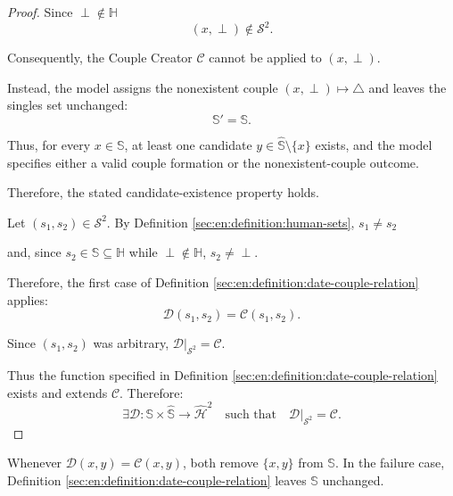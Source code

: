 \begin{theorem}
\begin{proof}
        Since $\perp\notin\mathbb H$
        $$(x,\perp)\notin\mathcal S^2. $$

        Consequently, the Couple Creator $\mathcal C$ cannot be applied to $(x,\perp)$.

        Instead, the model assigns the nonexistent couple $(x,\perp)\longmapsto\triangle$ and leaves the singles set unchanged:
        $$\mathbb S'=\mathbb S.$$

        Thus, for every $x\in\mathbb S$, at least one candidate $y\in\hat{\mathbb S}\setminus\{x\}$ exists, and the model specifies either a valid couple formation or the nonexistent-couple outcome.

        Therefore, the stated candidate-existence property holds.

        Let $(s_1,s_2)\in\mathcal S^{2}$. By Definition \ref{sec:en:definition:human-sets},
        $s_1\neq s_2$

        and, since $s_2\in\mathbb S\subseteq\mathbb H$ while $\perp\notin\mathbb H$,
        $s_2\neq\perp.$

        Therefore, the first case of Definition \ref{sec:en:definition:date-couple-relation} applies:
        $$\mathcal D(s_1,s_2)=\mathcal C(s_1,s_2).$$

        Since $(s_1,s_2)$ was arbitrary, $\mathcal D|_{\mathcal S^{2}}=\mathcal C.$

        Thus the function specified in Definition \ref{sec:en:definition:date-couple-relation} exists and extends $\mathcal C$. Therefore:
        $$\exists\mathcal D:
            \mathbb S\times\hat{\mathbb S}
            \longrightarrow\hat{\mathcal H}^{2}
            \quad\text{such that}\quad
            \mathcal D|_{\mathcal S^{2}}=\mathcal C.$$
    \end{proof}
\end{theorem}

\begin{corollary}
    Whenever $\mathcal D(x,y)=\mathcal C(x,y)$, both remove $\{x,y\}$ from $\mathbb S$. In the failure case, Definition \ref{sec:en:definition:date-couple-relation} leaves $\mathbb S$ unchanged.
\end{corollary}

